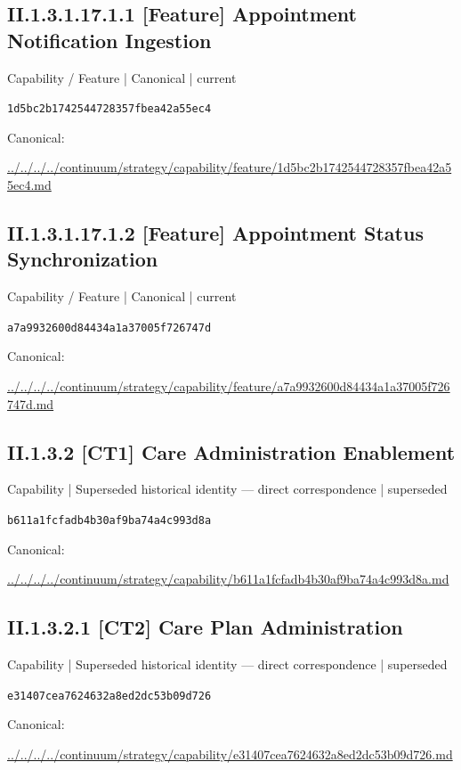 \documentclass[10pt,a4paper]{article}
\begin{document}
\subsection*{II.1.3.1.17.1.1 [Feature] Appointment Notification Ingestion}
{\small Capability / Feature | Canonical | current}\par
\texttt{1d5bc2b1742544728357fbea42a55ec4}\par
Canonical: \par
{\footnotesize\url{../../../../continuum/strategy/capability/feature/1d5bc2b1742544728357fbea42a55ec4.md}}\par
\subsection*{II.1.3.1.17.1.2 [Feature] Appointment Status Synchronization}
{\small Capability / Feature | Canonical | current}\par
\texttt{a7a9932600d84434a1a37005f726747d}\par
Canonical: \par
{\footnotesize\url{../../../../continuum/strategy/capability/feature/a7a9932600d84434a1a37005f726747d.md}}\par
\subsection*{II.1.3.2 [CT1] Care Administration Enablement}
{\small Capability | Superseded historical identity — direct correspondence | superseded}\par
\texttt{b611a1fcfadb4b30af9ba74a4c993d8a}\par
Canonical: \par
{\footnotesize\url{../../../../continuum/strategy/capability/b611a1fcfadb4b30af9ba74a4c993d8a.md}}\par
\subsection*{II.1.3.2.1 [CT2] Care Plan Administration}
{\small Capability | Superseded historical identity — direct correspondence | superseded}\par
\texttt{e31407cea7624632a8ed2dc53b09d726}\par
Canonical: \par
{\footnotesize\url{../../../../continuum/strategy/capability/e31407cea7624632a8ed2dc53b09d726.md}}\par
\end{document}
